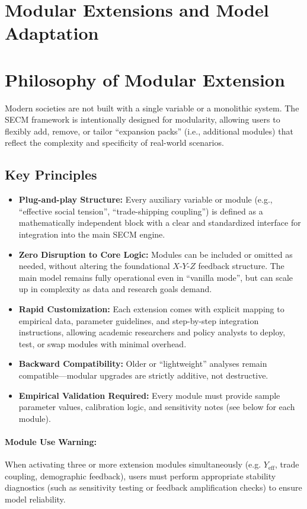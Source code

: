\documentclass[12pt]{report}
\begin{document}
\section{Modular Extensions and Model Adaptation}

\section{Philosophy of Modular Extension}
Modern societies are not built with a single variable or a monolithic system. The SECM framework is intentionally designed for modularity, allowing users to flexibly add, remove, or tailor ``expansion packs'' (i.e., additional modules) that reflect the complexity and specificity of real-world scenarios.

\subsection*{Key Principles}
\begin{itemize}
  \item \textbf{Plug-and-play Structure:} Every auxiliary variable or module (e.g., ``effective social tension'', ``trade-shipping coupling'') is defined as a mathematically independent block with a clear and standardized interface for integration into the main SECM engine.
  \item \textbf{Zero Disruption to Core Logic:} Modules can be included or omitted as needed, without altering the foundational $X$-$Y$-$Z$ feedback structure. The main model remains fully operational even in ``vanilla mode'', but can scale up in complexity as data and research goals demand.
  \item \textbf{Rapid Customization:} Each extension comes with explicit mapping to empirical data, parameter guidelines, and step-by-step integration instructions, allowing academic researchers and policy analysts to deploy, test, or swap modules with minimal overhead.
  \item \textbf{Backward Compatibility:} Older or ``lightweight'' analyses remain compatible—modular upgrades are strictly additive, not destructive.
  \item \textbf{Empirical Validation Required:} Every module must provide sample parameter values, calibration logic, and sensitivity notes (see below for each module).
\end{itemize}

\paragraph{Module Use Warning:}
When activating three or more extension modules simultaneously (e.g. $Y_{\text{eff}}$, trade coupling, demographic feedback), users must perform appropriate stability diagnostics (such as sensitivity testing or feedback amplification checks) to ensure model reliability.
\end{document}
